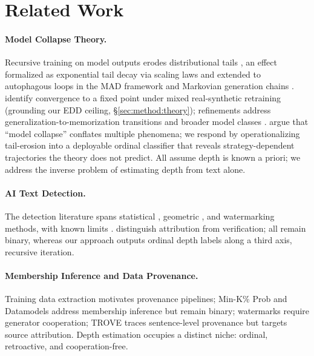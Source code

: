 \section{Related Work}
\label{sec:related}

\paragraph{Model Collapse Theory.}
Recursive training on model outputs erodes distributional tails \cite{shumailov2024_nature}, an effect formalized as exponential tail decay via scaling laws \cite{dohmatob2024_tale_of_tails,seddik2024synthetic} and extended to autophagous loops in the MAD framework \cite{alemohammad2024_mad} and Markovian generation chains \cite{geng2026_markovian}.
\citet{bertrand2024_stability} identify convergence to a fixed point under mixed real-synthetic retraining (grounding our EDD ceiling, \S\ref{sec:method:theory}); refinements address generalization-to-memorization transitions \cite{shi2025_closer_look} and broader model classes \cite{dohmatob2025_strong_collapse}.
\citet{schaeffer2025} argue that ``model collapse'' conflates multiple phenomena; we respond by operationalizing tail-erosion into a deployable ordinal classifier that reveals strategy-dependent trajectories the theory does not predict.
All assume depth is known a priori; we address the inverse problem of estimating depth from text alone.

\paragraph{AI Text Detection.}
The detection literature \cite{wu2025_detection_survey} spans statistical \cite{mitchell2023_detectgpt,fast_detectgpt2024,binoculars2024,gehrmann2019_gltr,verma2024_ghostbuster}, geometric \cite{tulchinskii2023_intrinsic_dim}, and watermarking \cite{kirchenbauer2023_watermark} methods, with known limits \cite{sadasivan2023_paraphrase,pudasaini2026_detection_fails}.
\citet{bevendorff2025_two_paradigms} distinguish attribution from verification; all remain binary, whereas our approach outputs ordinal depth labels along a third axis, recursive iteration.

\paragraph{Membership Inference and Data Provenance.}
Training data extraction \cite{carlini2021_extracting} motivates provenance pipelines; Min-K\% Prob \cite{shi2024_minkprob} and Datamodels \cite{ilyas2022datamodels} address membership inference but remain binary; watermarks \cite{christ2024_undetectable} require generator cooperation; TROVE \cite{zhu2025_trove} traces sentence-level provenance but targets source attribution.
Depth estimation occupies a distinct niche: ordinal, retroactive, and cooperation-free.

